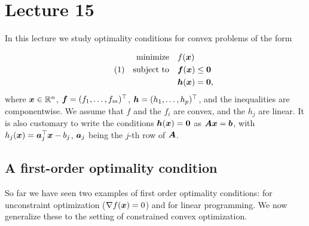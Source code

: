%
%
% 


\chapter*{Lecture 15}
\setcounter{chapter}{15}
\setcounter{section}{0}
\setcounter{equation}{0}
\setcounter{theorem}{0}


In this lecture we study optimality conditions for convex problems of the form

\begin{align*}\label{eq:constr}\tag{1}
\begin{split}
 \text{minimize}\quad & f(\bm{x})\\
 \quad\text{subject to}\quad & \bm{f}(\bm{x})\leq \bm{0}\\
         & \bm{h}(\bm{x})= \bm{0},
\end{split}
\end{align*}
where $\bm{x}\in \mathbb{R}^n$, $\bm{f}=(f_1,\dots,f_m)^{\top}$, $\bm{h}=(h_1,\dots,h_p)^{\top}$, and the inequalities are componentwise. We assume that $f$ and the $f_i$ are convex, and the $h_j$ are linear. It is also customary to write the conditions $\bm{h}(\bm{x})=\bm{0}$ as $\bm{A}\bm{x}=\bm{b}$, with $h_j(\bm{x}) = \bm{a}_j^{\top}\bm{x}-b_j$, $\bm{a}_j$ being the $j$-th row of $\bm{A}$.

\section{A first-order optimality condition}
So far we have seen two examples of first order optimality conditions: for unconstraint optimization ($\nabla f(\bm{x})=0$) and for linear programming. We now generalize these to the setting of constrained convex optimization.


